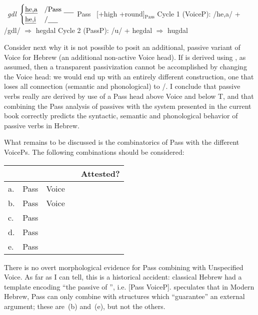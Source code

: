 \pex\label{ex:pass-vi}
	\a {} \lra~\emph{gdl}
	\a {\vd} \lra
	$\begin{cases}
	\text{\emph{he,a}} & / \text{Pass \trace}\\
	\text{\emph{he,i}} & / \text{\trace}\\
	\end{cases}$
	\a Pass \lra~[+high +round]$_{\text{Pass}}$
\xe
\pex
	\a Cycle 1 (VoiceP): /he,a/ + /gdl/ $\Rightarrow$ hegdal
	\a Cycle 2 (PassP): /u/ + hegdal $\Rightarrow$ hugdal
\xe

Consider next why it is not possible to posit an additional, passive variant of Voice for Hebrew (an additional non-active Voice head). If {\thif} is derived using \vd, as assumed, then a transparent passivization cannot be accomplished by changing the Voice head: we would end up with an entirely different construction, one that loses all connection (semantic and phonological) to \vd/{\thif}. I conclude that passive verbs really are derived by use of a Pass head above Voice and below T, and that combining the Pass analysis of passives with the system presented in the current book correctly predicts the syntactic, semantic and phonological behavior of passive verbs in Hebrew.
	
What remains to be discussed is the combinatorics of Pass with the different VoicePs. The following combinations should be considered:
\ex \begin{tabular}{llllc}
	& & & & Attested? \\\hline
	a.& Pass	&	Voice	& 		& \xmark \\
	b.& Pass	& Voice		& \va	& {\tpua} \\
	c.& Pass	& {\vz}		& 		& \xmark\\
	d.& Pass	& {\vz}		&	\va	& \xmark\\
	e.& Pass	& {\vd}		&		& {\thuf} \\
	\end{tabular}
\xe

There is no overt morphological evidence for Pass combining with Unspecified Voice. As far as I can tell, this is a historical accident: classical Hebrew had a template encoding ``the passive of {\tkal}'', i.e. [Pass VoiceP]. \citet[120]{kastner16phd} speculates that in Modern Hebrew, Pass can only combine with structures which ``guarantee'' an external argument; these are~(\lastx b) and~(\lastx e), but not the others.

